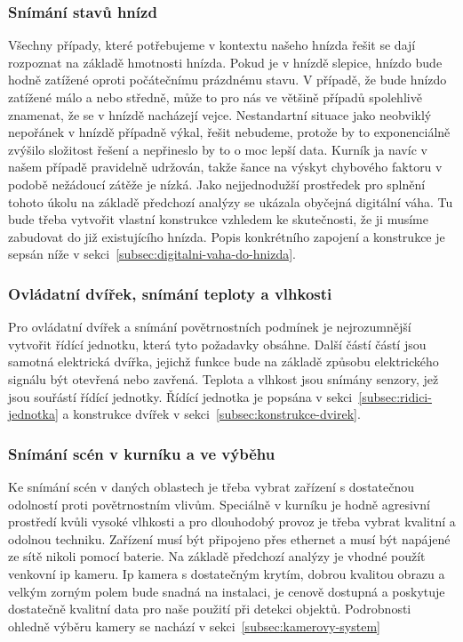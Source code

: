 \subsubsection{Snímání stavů hnízd}
Všechny případy, které potřebujeme v kontextu našeho hnízda řešit se dají rozpoznat na základě hmotnosti hnízda.
Pokud je v hnízdě slepice, hnízdo bude hodně zatížené oproti počátečnímu prázdnému stavu.
V případě, že bude hnízdo zatížené málo a nebo středně, může to pro nás ve většině případů spolehlivě znamenat, že se v hnízdě nacházejí vejce.
Nestandartní situace jako neobviklý nepořánek v hnízdě případně výkal, řešit nebudeme, protože by to exponenciálně zvýšilo složitost řešení a nepřineslo by to o moc lepší data.
Kurník ja navíc v našem případě pravidelně udržován, takže šance na výskyt chybového faktoru v podobě nežádoucí zátěže je nízká.
Jako nejjednodužší prostředek pro splnění tohoto úkolu na základě předchozí analýzy se ukázala obyčejná digitální váha.
Tu bude třeba vytvořit vlastní konstrukce vzhledem ke skutečnosti, že ji musíme zabudovat do již existujícího hnízda.
Popis konkrétního zapojení a konstrukce je sepsán níže v sekci~\ref{subsec:digitalni-vaha-do-hnizda}.

\subsubsection{Ovládatní dvířek, snímání teploty a vlhkosti}
Pro ovládatní dvířek a snímání povětrnostních podmínek je nejrozumnější vytvořit řídící jednotku, která tyto požadavky obsáhne.
Další částí částí jsou samotná elektrická dvířka, jejichž funkce bude na základě způsobu elektrického signálu být otevřená nebo zavřená.
Teplota a vlhkost jsou snímány senzory, jež jsou souřástí řídící jednotky.
Řídící jednotka je popsána v sekci~\ref{subsec:ridici-jednotka} a konstrukce dvířek v sekci~\ref{subsec:konstrukce-dvirek}.

\subsubsection{Snímání scén v kurníku a ve výběhu}
Ke snímání scén v daných oblastech je třeba vybrat zařízení s dostatečnou odolností proti povětrnostním vlivům.
Speciálně v kurníku je hodně agresivní prostředí kvůli vysoké vlhkosti a pro dlouhodobý provoz je třeba vybrat kvalitní a odolnou techniku.
Zařízení musí být připojeno přes ethernet a musí být napájené ze sítě nikoli pomocí baterie.
Na základě předchozí analýzy je vhodné použít venkovní ip kameru.
Ip kamera s dostatečným krytím, dobrou kvalitou obrazu a velkým zorným polem bude snadná na instalaci, je cenově dostupná a poskytuje dostatečně kvalitní data pro naše použití při detekci objektů.
Podrobnosti ohledně výběru kamery se nachází v sekci~\ref{subsec:kamerovy-system}

